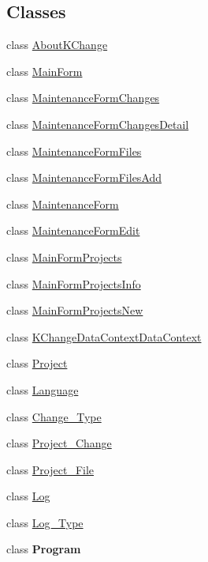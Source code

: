 \subsection*{Classes}
\begin{DoxyCompactItemize}
\item 
class \hyperlink{class_k_change_logger_1_1_about_k_change}{About\-K\-Change}
\item 
class \hyperlink{class_k_change_logger_1_1_main_form}{Main\-Form}
\item 
class \hyperlink{class_k_change_logger_1_1_maintenance_form_changes}{Maintenance\-Form\-Changes}
\item 
class \hyperlink{class_k_change_logger_1_1_maintenance_form_changes_detail}{Maintenance\-Form\-Changes\-Detail}
\item 
class \hyperlink{class_k_change_logger_1_1_maintenance_form_files}{Maintenance\-Form\-Files}
\item 
class \hyperlink{class_k_change_logger_1_1_maintenance_form_files_add}{Maintenance\-Form\-Files\-Add}
\item 
class \hyperlink{class_k_change_logger_1_1_maintenance_form}{Maintenance\-Form}
\item 
class \hyperlink{class_k_change_logger_1_1_maintenance_form_edit}{Maintenance\-Form\-Edit}
\item 
class \hyperlink{class_k_change_logger_1_1_main_form_projects}{Main\-Form\-Projects}
\item 
class \hyperlink{class_k_change_logger_1_1_main_form_projects_info}{Main\-Form\-Projects\-Info}
\item 
class \hyperlink{class_k_change_logger_1_1_main_form_projects_new}{Main\-Form\-Projects\-New}
\item 
class \hyperlink{class_k_change_logger_1_1_k_change_data_context_data_context}{K\-Change\-Data\-Context\-Data\-Context}
\item 
class \hyperlink{class_k_change_logger_1_1_project}{Project}
\item 
class \hyperlink{class_k_change_logger_1_1_language}{Language}
\item 
class \hyperlink{class_k_change_logger_1_1_change___type}{Change\-\_\-\-Type}
\item 
class \hyperlink{class_k_change_logger_1_1_project___change}{Project\-\_\-\-Change}
\item 
class \hyperlink{class_k_change_logger_1_1_project___file}{Project\-\_\-\-File}
\item 
class \hyperlink{class_k_change_logger_1_1_log}{Log}
\item 
class \hyperlink{class_k_change_logger_1_1_log___type}{Log\-\_\-\-Type}
\item 
class {\bfseries Program}
\end{DoxyCompactItemize}
